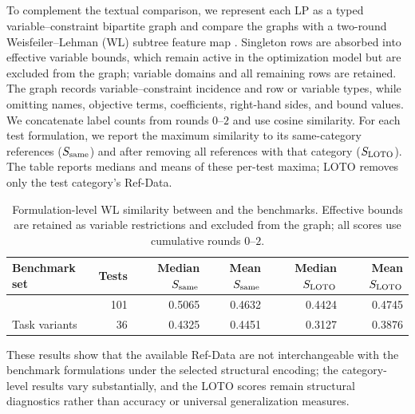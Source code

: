 \subsection{}
To complement the textual comparison, we represent each LP as a typed
variable--constraint bipartite graph and compare the graphs with a
two-round Weisfeiler--Lehman (WL) subtree feature map
\citep{Gasse2019,Shervashidze2011}. Singleton rows are absorbed into
effective variable bounds, which remain active in the optimization model
but are excluded from the graph; variable domains and all remaining rows
are retained. The graph records variable--constraint incidence and row or
variable types, while omitting names, objective terms, coefficients,
right-hand sides, and bound values. We concatenate label counts from
rounds $0$--$2$ and use cosine similarity. For each test formulation, we
report the maximum similarity to its same-category references
($S_{\rm same}$) and after removing all references with that category
($S_{\rm LOTO}$). The table reports medians and means of these per-test
maxima; LOTO removes only the test category's Ref-Data.

\begin{table}[H]
\centering\small
\caption{Formulation-level WL similarity between  and the
benchmarks. Effective bounds are retained as variable restrictions and
excluded from the graph; all scores use cumulative rounds $0$--$2$.}
\label{tab:manuscript-wl-summary}
\setlength{\tabcolsep}{6pt}
\begin{tabular}{@{}lrrrrr@{}}
\toprule
Benchmark set & Tests & Median $S_{\rm same}$ & Mean $S_{\rm same}$ &
Median $S_{\rm LOTO}$ & Mean $S_{\rm LOTO}$\\
\midrule
\testdata{} & 101 & 0.5065 & 0.4632 & 0.4424 & 0.4745\\
Task variants & 36 & 0.4325 & 0.4451 & 0.3127 & 0.3876\\
\bottomrule
\end{tabular}
\end{table}

These results show that the available Ref-Data are not interchangeable
with the benchmark formulations under the selected structural encoding;
the category-level results vary substantially, and the LOTO scores remain
structural diagnostics rather than accuracy or universal generalization
measures.
\endgroup
